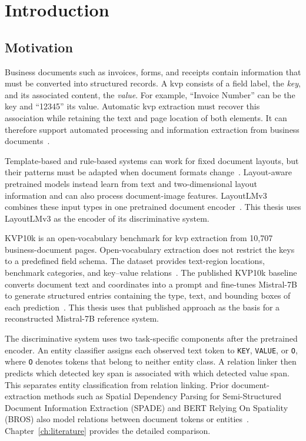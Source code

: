 \chapter{Introduction}
\label{ch:introduction}

\section{Motivation}
\label{sec:motivation}

Business documents such as invoices, forms, and receipts contain information
that must be converted into structured records. A \gls{kvp} consists of a
field label, the \emph{key}, and its associated content, the \emph{value}. For
example, ``Invoice Number'' can be the key and ``12345'' its value. Automatic
\gls{kvp} extraction must recover this association while retaining the text
and page location of both elements. It can therefore support automated
processing and information extraction from business documents~\cite{kvp10k}.

Template-based and rule-based systems can work for fixed document layouts, but
their patterns must be adapted when document formats change~\cite{layoutlm,kvp10k}.
Layout-aware pretrained models instead learn from text and two-dimensional
layout information and can also process document-image features. LayoutLMv3
combines these input types in one pretrained document encoder~\cite{layoutlmv3}.
This thesis uses LayoutLMv3 as the encoder of its discriminative system.

KVP10k is an open-vocabulary benchmark for \gls{kvp} extraction from 10{,}707
business-document pages. Open-vocabulary extraction does not restrict
the keys to a predefined field schema. The dataset provides text-region
locations, benchmark categories, and key--value relations~\cite{kvp10k}. The
published KVP10k baseline converts document text and coordinates into a prompt
and fine-tunes Mistral-7B to generate structured entries containing the type,
text, and bounding boxes of each prediction~\cite{kvp10k,mistral}. This thesis
uses that published approach as the basis for a reconstructed Mistral-7B
reference system.

The discriminative system uses two task-specific components after the
pretrained encoder. An entity classifier assigns each observed text token to
\texttt{KEY}, \texttt{VALUE}, or \texttt{O}, where \texttt{O} denotes tokens
that belong to neither entity class. A relation linker then predicts which
detected key span is associated with which detected value span.
This separates entity classification from relation linking. Prior
document-extraction methods such as Spatial Dependency Parsing for
Semi-Structured Document Information Extraction (SPADE) and BERT Relying On
Spatiality (BROS) also model relations between document tokens or
entities~\cite{spade,bros}. Chapter~\ref{ch:literature} provides the detailed
comparison.

